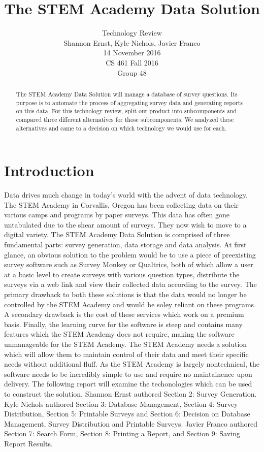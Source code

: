 \documentclass[letterpaper,10pt,serif, draftclsnofoot,onecolumn, compsoc, titlepage]{IEEEtran}
\title{The STEM Academy Data Solution}
\author{Technology Review \\ Shannon Ernst, Kyle Nichols, Javier Franco\\ 14 November 2016\\ CS 461 Fall 2016\\ Group 48}
\begin{document}
\maketitle
\begin{abstract}
The STEM Academy Data Solution will manage a database of survey questions.
Its purpose is to automate the process of aggregating survey data and generating reports on this data.
For this technology review, split our product into subcomponents and compared three different alternatives for those subcomponents.
We analyzed these alternatives and came to a decision on which technology we would use for each.
\end{abstract}
\newpage
\section{Introduction}
Data drives much change in today's world with the advent of data technology. The STEM Academy in Corvallis,
 Oregon has been collecting data on their various camps and programs by paper surveys. This data has often 
gone untabulated due to the shear amount of surveys. They now wish to move to a digital variety.
 The STEM Academy Data Solution is comprised of three fundamental parts: survey generation, data storage and data analysis.
At first glance, an obvious solution to the problem would be to use a piece of preexisting survey software such as Survey Monkey \cite{surveyMonkey}
or Qualtrics\cite{qualtrics}, both of which allow a user at a basic level to create surveys with various question types, distribute the surveys 
via a web link and view their collected data according to the survey. The primary drawback to both these solutions is that the 
data would no longer be controlled by the STEM Academy and would be soley reliant on these programs. A secondary drawback
 is the cost of these services which work on a premium basis\cite{surveyMonkeyCost}. Finally, the learning curve for the software is steep and contains
many features which the STEM Academy does not require, making the software unmanageable for the STEM Academy. 
The STEM Academy needs a solution which will allow them to maintain control of their data and meet their specific needs without
additional fluff. As the STEM Academy is largely nontechnical, the software needs to be incredibly simple to use and require no 
maintainence upon delivery. The following report will examine the techonologies which can be used to construct the solution. Shannon Ernst authored Section 2: Survey Generation. Kyle Nichols authored Section 3: Database Management, Section 4: Survey Distribution, Section 5: Printable Surveys and Section 6: Decision on Database Management, Survey Distribution and Printable Surveys. Javier Franco authored Section 7: Search Form, Section 8: Printing a Report, and Section 9: Saving Report Results. 
\end{document}
